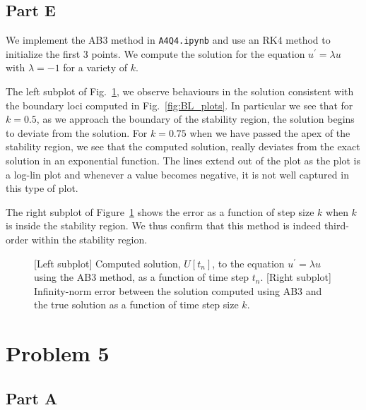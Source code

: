 \documentclass[12pt]{article}
\begin{document}
\subsection*{Part E}

We implement the AB3 method in \verb|A4Q4.ipynb|  and use an RK4 method to initialize the first 3 points. We compute the solution for the equation $u^{\prime} = \lambda u$ with $\lambda = -1$ for a variety of $k$. 

The left subplot of Fig.~\ref{fig:AB3_soln_fig}, we observe behaviours in the solution consistent with the boundary loci computed in Fig.~\ref{fig:BL_plots}. In particular we see that for $k = 0.5$, as we approach the boundary of the stability region, the solution begins to deviate from the solution. For $k = 0.75$ when we have passed the apex of the stability region, we see that the computed solution, really deviates from the exact solution in an exponential function. The lines extend out of the plot as the plot is a log-lin plot and whenever a value becomes negative, it is not well captured in this type of plot. 

The right subplot of Figure~\ref{fig:AB3_soln_fig} shows the error as a function of step size $k$ when $k$ is inside the stability region. We thus confirm that this method is indeed third-order within the stability region. 

\begin{figure}[!h]
    \centering
    \caption{[Left subplot] Computed solution, $U[t_{n}]$, to the equation $u^{\prime} = \lambda u$ using the AB3 method,  as a function of time step $t_{n}$. [Right subplot] Infinity-norm error between the solution computed using AB3 and the true solution as a function of time step size $k$.}
    \label{fig:AB3_soln_fig}
\end{figure}


\section*{Problem 5}

\subsection*{Part A}
\end{document}
